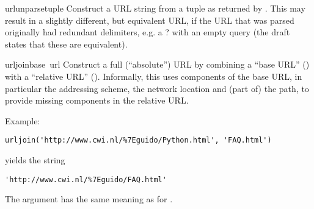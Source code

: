 \begin{funcdesc}{urlunparse}{tuple}
Construct a URL string from a tuple as returned by .
This may result in a slightly different, but equivalent URL, if the
URL that was parsed originally had redundant delimiters, e.g. a ? with
an empty query (the draft states that these are equivalent).
\end{funcdesc}

\begin{funcdesc}{urljoin}{base\, url}
Construct a full (``absolute'') URL by combining a ``base URL''
() with a ``relative URL'' ().  Informally, this
uses components of the base URL, in particular the addressing scheme,
the network location and (part of) the path, to provide missing
components in the relative URL.

Example:

\begin{verbatim}
urljoin('http://www.cwi.nl/%7Eguido/Python.html', 'FAQ.html')
\end{verbatim}
%
yields the string

\begin{verbatim}
'http://www.cwi.nl/%7Eguido/FAQ.html'
\end{verbatim}
%
The  argument has the same meaning as for
.
\end{funcdesc}
